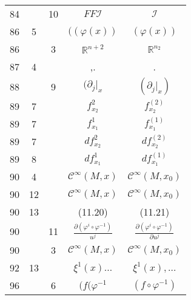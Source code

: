 \documentclass[a4paper,11pt]{article}
\newcommand{\fr}{\frac}
\newcommand{\mb}{\mathbb}
\newcommand{\mc}{\mathcal}
\newcommand{\pr}{\partial}
\newcommand{\ld}{\ldots}
\newcommand{\vp}{\varphi}
\newcommand{\R}{\mb{R}}
\newcommand{\Cc}{\mc{C}}
\newcommand{\I}{\mc{I}}
\begin{document}
\begin{center}
\begin{tabular}{|c|c|c|c|c|}
    84 & & 10 & $FF\I$ & $\I$ \\
    86 & 5 & & $( ( \vp( x ) )$ & $( \vp( x ) )$ \\
    86 & &  3 & $\R^{ n + 2 }$ & $\R^{ n_{ 2 } }$ \\
    87 & 4 & & ,. & . \\
    88 & &  9 & $( \pr_{ j }|_{ x }$ & $( \pr_{ j }|_{ x } )$ \\
    89 &  7 & & $f_{ x_{ 2 } }^{ 2 }$ & $f_{ x_{ 2 } }^{ ( 2 ) }$ \\
    89 &  7 & & $f_{ x_{ 1 } }^{ 1 }$ & $f_{ x_{ 1 } }^{ ( 1 ) }$ \\
    89 &  7 & & $d f_{ x_{ 2 } }^{ 2 }$ & $d f_{ x_{ 2 } }^{ ( 2 ) }$ \\
    89 &  8 & & $d f_{ x_{ 1 } }^{ 1 }$ & $d f_{ x_{ 1 } }^{ ( 1 ) }$ \\
    90 &  4 & & $\Cc^{ \infty }( M, x )$ & $\Cc^{ \infty }( M, x_{ 0 } )$ \\
    90 & 12 & & $\Cc^{ \infty }( M, x )$
           & $\Cc^{ \infty }( M, x_{ 0 } )$ \\
    90 & 13 & & (11.20) & (11.21) \\
    90 & & 11 & $\fr{ \pr ( \vp^{ i } \circ \vp^{ -1 } ) }{ u^{ j } }$
           & $\fr{ \pr ( \vp^{ i } \circ \vp^{ -1 } ) }{ \pr u^{ j } }$ \\
    90 & &  3 & $\Cc^{ \infty }( M, x )$
           & $\Cc^{ \infty }( M, x_{ 0 } )$ \\
    92 & 13 & & $\xi^{ 1 }(x) \ld$ & $\xi^{ 1 }(x), \ld$ \\
    96 & & 6 & $( f ( \vp^{ -1 }$ & $( f \circ \vp^{ -1 } )$ \\ \hline
  \end{tabular}



\end{center}
\end{document}
